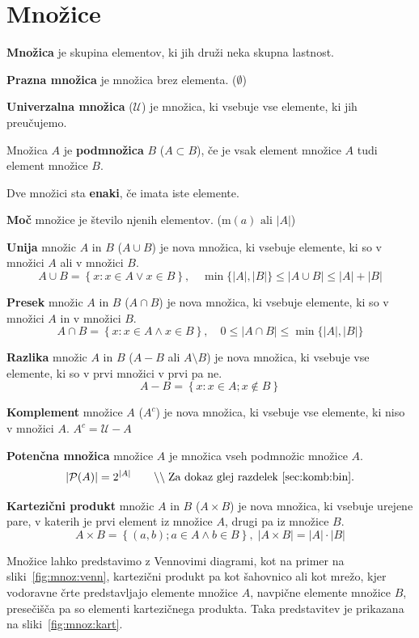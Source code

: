 \documentclass[a4paper,oneside,12pt,fleqn]{article}
\newcommand\krat\cdot
\newcommand{\comment}[1]{\ensuremath{\qquad\backslash\backslash\;}\textnormal{#1}}
\numberwithin{equation}{section}
\begin{document}
\section{Množice}
\label{sec:mnozice}
\textbf{Množica} je skupina elementov, ki jih druži neka skupna lastnost. 

\textbf{Prazna množica} je množica brez elementa. ($\emptyset$)

\textbf{Univerzalna množica} ($\mathcal{U}$) je množica, ki vsebuje vse elemente, ki jih preučujemo.

Množica $A$ je \textbf{podmnožica} $B$ ($A \subset B$), če je vsak element množice $A$ tudi element
množice $B$.

Dve množici sta \textbf{enaki}, če imata iste elemente.

\textbf{Moč} množice je število njenih elementov. ($\text{m}(a) \text{ ali } |A|$) 

\textbf{Unija} množic $A$ in $B$ ($A \cup B$) je nova množica, ki vsebuje elemente, ki so v množici $A$ ali v
množici $B$. \[ A \cup B = \left\{x:x \in A \lor x \in B \right\}, \quad \min\{|A|, |B|\} \le |A \cup B| \le |A| + |B| \]

\textbf{Presek} množic $A$ in $B$ ($A \cap B$) je nova množica, ki vsebuje elemente, ki so v množici $A$ in v
množici $B$. \[ A \cap B = \left\{x:x \in A \land x \in B \right\}, \quad 0 \le |A \cap B|
\le \min\{|A|, |B|\} \]

\textbf{Razlika} množic $A$ in $B$ ($A - B$ ali $A \setminus B$) je nova množica, ki
vsebuje vse elemente, ki so v prvi množici v prvi pa ne. 
\[ A - B = \left\{x : x \in A; x \notin B \right\} \]

\textbf{Komplement} množice $A$ ($A^c$) je nova množica, ki vsebuje vse elemente, ki niso
v množici $A$. $A^c = \mathcal{U} - A$

\textbf{Potenčna množica} množice $A$ je množica vseh podmnožic množice $A$.
\[ |\mathcal{P}(A)| = 2^{|A|} \comment{Za dokaz glej razdelek~\ref{sec:komb:bin}.} \]

\textbf{Kartezični produkt} množic $A$ in $B$ ($A \times B$) je nova množica, ki vsebuje urejene pare, v katerih
je prvi element iz množice $A$, drugi pa iz množice $B$. 
\[ A \times B = \left\{ \left(a, b \right); a \in A \land b \in B \right\}, \; \left|A \times B \right| = \left|A\right|
\krat \left|B\right| \]

Množice lahko predstavimo z Vennovimi diagrami, kot na primer na
sliki~\ref{fig:mnoz:venn}, kartezični produkt pa kot šahovnico ali kot mrežo, kjer vodoravne črte
predstavljajo elemente množice $A$, navpične elemente množice $B$, presečišča pa so
elementi kartezičnega produkta. Taka predstavitev je prikazana na
sliki~\ref{fig:mnoz:kart}.
\end{document}
